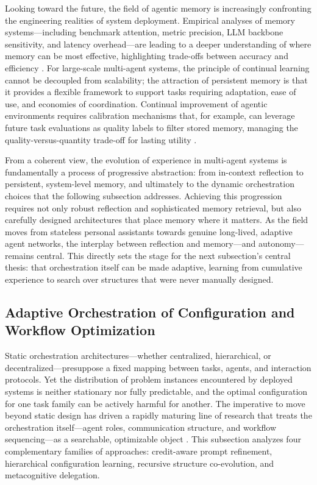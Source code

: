 \documentclass[11pt,a4paper]{article}
\begin{document}
Looking toward the future, the field of agentic memory is increasingly confronting the engineering realities of system deployment. Empirical analyses of memory systems---including benchmark attention, metric precision, LLM backbone sensitivity, and latency overhead---are leading to a deeper understanding of where memory can be most effective, highlighting trade-offs between accuracy and efficiency \cite{arxiv:2602.19320v2}. For large-scale multi-agent systems, the principle of continual learning cannot be decoupled from scalability; the attraction of persistent memory is that it provides a flexible framework to support tasks requiring adaptation, ease of use, and economies of coordination. Continual improvement of agentic environments requires calibration mechanisms that, for example, can leverage future task evaluations as quality labels to filter stored memory, managing the quality-versus-quantity trade-off for lasting utility \cite{arxiv:2505.16067v2}.

From a coherent view, the evolution of experience in multi-agent systems is fundamentally a process of progressive abstraction: from in-context reflection to persistent, system-level memory, and ultimately to the dynamic orchestration choices that the following subsection addresses. Achieving this progression requires not only robust reflection and sophisticated memory retrieval, but also carefully designed architectures that place memory where it matters. As the field moves from stateless personal assistants towards genuine long-lived, adaptive agent networks, the interplay between reflection and memory---and autonomy---remains central. This directly sets the stage for the next subsection's central thesis: that orchestration itself can be made adaptive, learning from cumulative experience to search over structures that were never manually designed.


\subsection{Adaptive Orchestration of Configuration and Workflow Optimization}


Static orchestration architectures---whether centralized, hierarchical, or decentralized---presuppose a fixed mapping between tasks, agents, and interaction protocols. Yet the distribution of problem instances encountered by deployed systems is neither stationary nor fully predictable, and the optimal configuration for one task family can be actively harmful for another. The imperative to move beyond static design has driven a rapidly maturing line of research that treats the orchestration itself---agent roles, communication structure, and workflow sequencing---as a searchable, optimizable object \cite{arxiv:2501.06322v1}. This subsection analyzes four complementary families of approaches: credit-aware prompt refinement, hierarchical configuration learning, recursive structure co-evolution, and metacognitive delegation.
\end{document}

